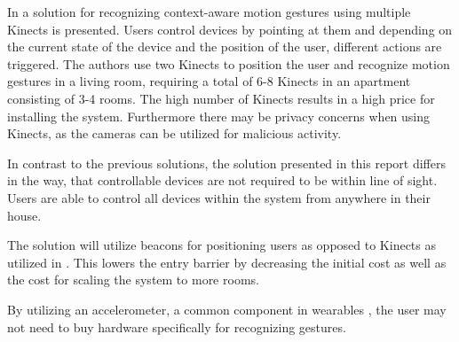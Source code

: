 In \cite{caon2011context} a solution for recognizing context-aware motion gestures using multiple Kinects is presented. Users control devices by pointing at them and depending on the current state of the device and the position of the user, different actions are triggered.
The authors use two Kinects to position the user and recognize motion gestures in a living room, requiring a total of 6-8 Kinects in an apartment consisting of 3-4 rooms. The high number of  Kinects results in a high price for installing the system. Furthermore there may be privacy concerns when using Kinects, as the cameras can be utilized for malicious activity.

In contrast to the previous solutions, the solution presented in this report differs in the way, that controllable devices are not required to be within line of sight. Users are able to control all devices within the system from anywhere in their house.

The solution will utilize beacons for positioning users as opposed to Kinects as utilized in \cite{caon2011context}. This lowers the entry barrier by decreasing the initial cost as well as the cost for scaling the system to more rooms.

By utilizing an accelerometer, a common component in wearables \cite[pp. 3-4]{prespecialisation}, the user may not need to buy hardware specifically for recognizing gestures.

